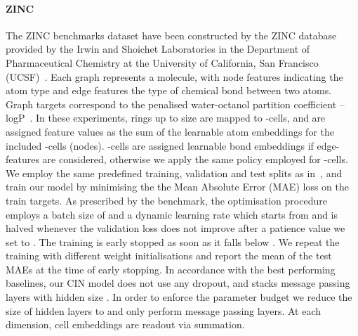 \documentclass{article}
\begin{document}
\paragraph{ZINC} The ZINC benchmarks dataset have been constructed by the ZINC database provided by the Irwin and Shoichet Laboratories in the Department of Pharmaceutical Chemistry at the University of California, San Francisco (UCSF)~\citep{ZINCdataset}. Each graph represents a molecule, with node features indicating the atom type and edge features the type of chemical bond between two atoms. Graph targets correspond to the penalised water-octanol partition coefficient -- logP~\cite{gomez2018automatic}. In these experiments, rings up to size  are mapped to -cells, and are assigned feature values as the sum of the learnable atom embeddings for the included -cells (nodes). -cells are assigned learnable bond embeddings if edge-features are considered, otherwise we apply the same policy employed for -cells. We employ the same predefined training, validation and test splits as in~\citet{dwivedi2020benchmarkgnns}, and train our model by minimising the the Mean Absolute Error (MAE) loss on the train targets. As prescribed by the benchmark, the optimisation procedure employs a batch size of  and a dynamic learning rate which starts from  and is halved whenever the validation loss does not improve after a patience value we set to . The training is early stopped as soon as it falls below . We repeat the training with  different weight initialisations and report the mean of the test MAEs at the time of early stopping. In accordance with the best performing baselines, our CIN model does not use any dropout, and stacks  message passing layers with hidden size . In order to enforce the parameter budget we reduce the size of hidden layers to  and only perform  message passing layers. At each dimension, cell embeddings are readout via summation.
\end{document}
